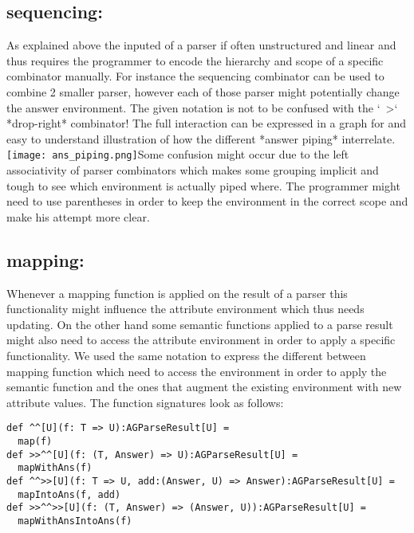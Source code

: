 \subsection{sequencing:  }
As explained above the inputed of a parser if often unstructured and linear and thus requires the programmer to encode the hierarchy and scope of a specific combinator manually. 
For instance the sequencing combinator can be used to combine 2 smaller parser, however each of those parser might potentially change the answer environment.
The given notation is not to be confused with the `~>` *drop-right* combinator!
The full interaction can be expressed in a graph for and easy to understand illustration of how the different *answer piping* interrelate.
\texttt{[image: ans\_piping.png]}Some confusion might occur due to the left associativity of parser combinators which makes some grouping implicit and tough to see which environment is actually piped where.
The programmer might need to use parentheses in order to keep the environment in the correct scope and make his attempt more clear.


\subsection{mapping: }
Whenever a mapping function is applied on the result of a parser this functionality might influence the attribute environment which thus needs updating. On the other hand some semantic functions applied to a parse result might also need to access the attribute environment in order to apply a specific functionality. We used the same notation to express the different between mapping function which need to access the environment in order to apply the semantic function and the ones that augment the existing environment with new attribute values.
The function signatures look as follows:

\begin{lstlisting}
def ^^[U](f: T => U):AGParseResult[U] =
  map(f)
def >>^^[U](f: (T, Answer) => U):AGParseResult[U] =
  mapWithAns(f)
def ^^>>[U](f: T => U, add:(Answer, U) => Answer):AGParseResult[U] =
  mapIntoAns(f, add)
def >>^^>>[U](f: (T, Answer) => (Answer, U)):AGParseResult[U] =
  mapWithAnsIntoAns(f)
\end{lstlisting}

